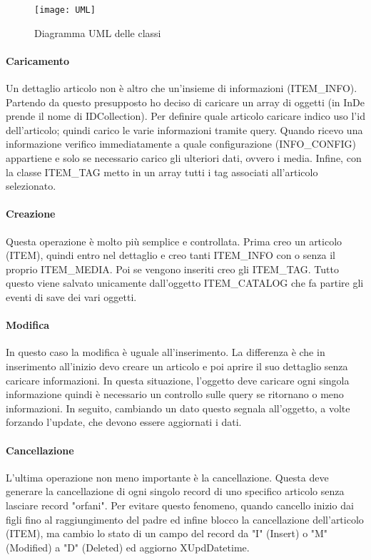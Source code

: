 \begin{figure}[!h] 
	\centering 
	\texttt{[image: UML]} 
	\caption{Diagramma UML delle classi}
	\label{UML}
\end{figure}

\paragraph{Caricamento}
Un dettaglio articolo non è altro che un'insieme di informazioni (ITEM\_INFO). Partendo da questo presupposto ho deciso di caricare un array di oggetti (in InDe prende il nome di IDCollection).
Per definire quale articolo caricare indico uso l'id dell'articolo; quindi carico le varie informazioni tramite query. Quando ricevo una informazione verifico immediatamente a quale configurazione (INFO\_CONFIG) appartiene e solo se necessario carico gli ulteriori dati, ovvero i media. Infine, con la classe ITEM\_TAG metto in un array tutti i tag associati all'articolo selezionato.

\paragraph{Creazione}
Questa operazione è molto più semplice e controllata. Prima creo un articolo (ITEM), quindi entro nel dettaglio e creo tanti ITEM\_INFO con o senza il proprio ITEM\_MEDIA. Poi se vengono inseriti creo gli ITEM\_TAG. Tutto questo viene salvato unicamente dall'oggetto ITEM\_CATALOG che fa partire gli eventi di save dei vari oggetti.

\paragraph{Modifica}
In questo caso la modifica è uguale all'inserimento. La differenza è che in inserimento all'inizio devo creare un articolo e poi aprire il suo dettaglio senza caricare informazioni. In questa situazione, l'oggetto deve caricare ogni singola informazione quindi è necessario un controllo sulle query se ritornano o meno informazioni. In seguito, cambiando un dato questo segnala all'oggetto, a volte forzando l'update, che devono essere aggiornati i dati.

\paragraph{Cancellazione}
L'ultima operazione non meno importante è la cancellazione. Questa deve generare la cancellazione di ogni singolo record di uno specifico articolo senza lasciare record "orfani". Per evitare questo fenomeno, quando cancello inizio dai figli fino al raggiungimento del padre ed infine blocco la cancellazione dell'articolo (ITEM), ma cambio lo stato di un campo del record da "I" (Insert) o "M"(Modified) a "D" (Deleted) ed aggiorno XUpdDatetime.

